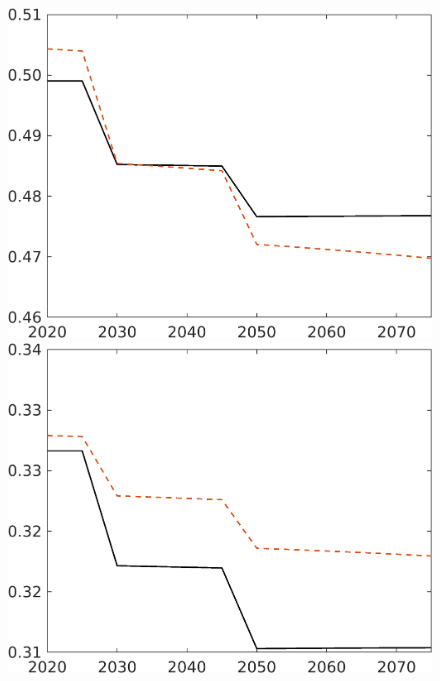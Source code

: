 \begin{figure}[h!!]
\begin{minipage}[]{0.32\textwidth}
	\includegraphics[width=1\textwidth]{../../codding_model/own_basedOnFried/optimalPol_190722_tidiedUp/figures/all_July22/hh_CompEffOPT_T_NoTaus_opteff_spillover0_noskill0_sep1_xgrowth0_countec0_etaa0.79_lgd0_lff0.png}
\end{minipage}
	\begin{minipage}[]{0.32\textwidth}
	\includegraphics[width=1\textwidth]{../../codding_model/own_basedOnFried/optimalPol_190722_tidiedUp/figures/all_July22/hl_CompEffOPT_T_NoTaus_opteff_spillover0_noskill0_sep1_xgrowth0_countec0_etaa0.79_lgd0_lff0.png}
\end{minipage}


\end{figure}
